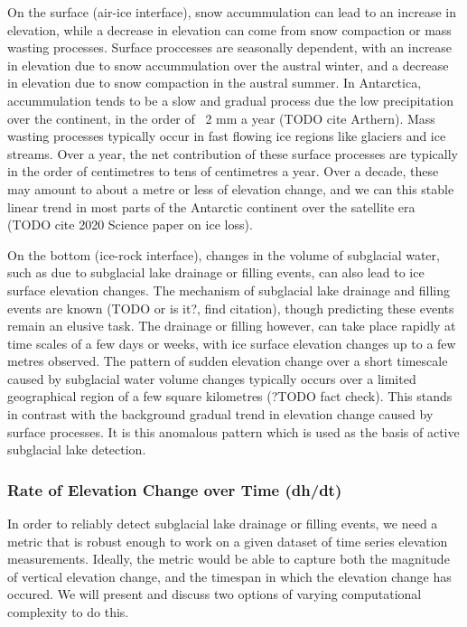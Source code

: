 On the surface (air-ice interface), snow accummulation can lead to an increase in elevation, while a decrease in elevation can come from snow compaction or mass wasting processes.
Surface proccesses are seasonally dependent, with an increase in elevation due to snow accummulation over the austral winter, and a decrease in elevation due to snow compaction in the austral summer.
In Antarctica, accummulation tends to be a slow and gradual process due the low precipitation over the continent, in the order of ~2 mm a year (TODO cite Arthern).
Mass wasting processes typically occur in fast flowing ice regions like glaciers and ice streams.
Over a year, the net contribution of these surface processes are typically in the order of centimetres to tens of centimetres a year.
Over a decade, these may amount to about a metre or less of elevation change, and we can this stable linear trend in most parts of the Antarctic continent over the satellite era (TODO cite 2020 Science paper on ice loss).


On the bottom (ice-rock interface), changes in the volume of subglacial water, such as due to subglacial lake drainage or filling events, can also lead to ice surface elevation changes.
The mechanism of subglacial lake drainage and filling events are known (TODO or is it?, find citation), though predicting these events remain an elusive task.
The drainage or filling however, can take place rapidly at time scales of a few days or weeks, with ice surface elevation changes up to a few metres observed.
The pattern of sudden elevation change over a short timescale caused by subglacial water volume changes typically occurs over a limited geographical region of a few square kilometres (?TODO fact check).
This stands in contrast with the background gradual trend in elevation change caused by surface processes.
It is this anomalous pattern which is used as the basis of active subglacial lake detection.

\subsubsection{Rate of Elevation Change over Time (dh/dt)}

In order to reliably detect subglacial lake drainage or filling events, we need a metric that is robust enough to work on a given dataset of time series elevation measurements.
Ideally, the metric would be able to capture both the magnitude of vertical elevation change, and the timespan in which the elevation change has occured.
We will present and discuss two options of varying computational complexity to do this.


